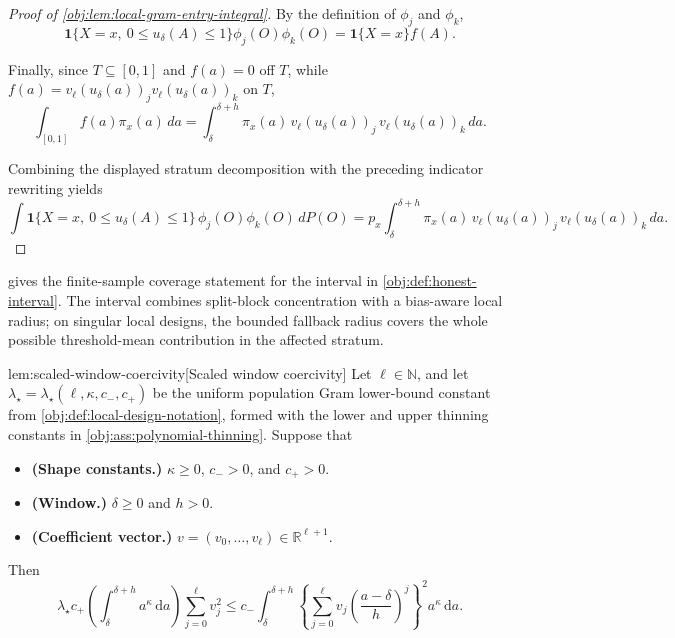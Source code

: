 \documentclass[11pt]{article}
\begin{document}
\begin{proof}[Proof of \cref{obj:lem:local-gram-entry-integral}]
By the definition of \(\phi_j\) and \(\phi_k\),
\[
\mathbf 1\{X=x,\ 0\le u_\delta(A)\le1\}\phi_j(O)\phi_k(O)
=
\mathbf 1\{X=x\}f(A).
\] %

Finally, since \(T\subseteq[0,1]\) and \(f(a)=0\) off \(T\), while
\(f(a)=v_\ell(u_\delta(a))_jv_\ell(u_\delta(a))_k\) on \(T\),
\[
\int_{[0,1]}f(a)\pi_x(a)\,da
=
\int_{\delta}^{\delta+h}
\pi_x(a)\,
v_\ell(u_\delta(a))_j\,
v_\ell(u_\delta(a))_k\,da .
\] %

Combining the displayed stratum decomposition with the preceding indicator rewriting yields
\[
\int \mathbf 1\{X=x,\ 0\le u_\delta(A)\le 1\}\,\phi_j(O)\phi_k(O)\,dP(O)
=
p_x\int_{\delta}^{\delta+h}
\pi_x(a)\,
v_\ell(u_\delta(a))_j\,
v_\ell(u_\delta(a))_k\,da .
\] %
\end{proof}

 gives the finite-sample coverage statement for the interval in \cref{obj:def:honest-interval}. The interval combines split-block concentration with a bias-aware local radius; on singular local designs, the bounded fallback radius covers the whole possible threshold-mean contribution in the affected stratum.

\begin{lemmav}{lem:scaled-window-coercivity}[Scaled window coercivity]
Let \(\ell\in\mathbb N\), and let \(\lambda_\star=\lambda_\star(\ell,\kappa,c_-,c_+)\) be the uniform population Gram lower-bound constant from \cref{obj:def:local-design-notation}, formed with the lower and upper thinning constants in \cref{obj:ass:polynomial-thinning}. Suppose that
\begin{itemize}
\item \textbf{(Shape constants.)} \(\kappa\ge 0\), \(c_->0\), and \(c_+>0\).
\item \textbf{(Window.)} \(\delta\ge 0\) and \(h>0\).
\item \textbf{(Coefficient vector.)} \(v=(v_0,\ldots,v_\ell)\in\mathbb R^{\ell+1}\).
\end{itemize}
Then
\[
\lambda_\star c_+
\left(\int_{\delta}^{\delta+h} a^\kappa\,\mathrm da\right)
\sum_{j=0}^{\ell} v_j^2
\le
c_-
\int_{\delta}^{\delta+h}
\left\{
\sum_{j=0}^{\ell}
v_j\left(\frac{a-\delta}{h}\right)^j
\right\}^2
a^\kappa\,\mathrm da .
\]
\end{lemmav}
\end{document}
